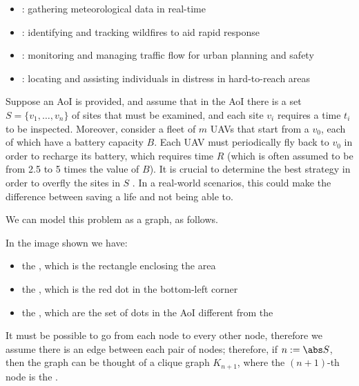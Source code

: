 \documentclass[a4paper, 12pt]{report}
\begin{document}
    \begin{itemize}
        \item {}: gathering meteorological data in real-time
        \item {}: identifying and tracking wildfires to aid rapid response
        \item {}: monitoring and managing traffic flow for urban planning and safety
        \item {}: locating and assisting individuals in distress in hard-to-reach areas
    \end{itemize}

    Suppose an AoI is provided, and assume that in the AoI there is a set $S = \{v_1, \ldots, v_n\}$ of sites that must be examined, and each site $v_i$ requires a time $t_i$ to be inspected. Moreover, consider a fleet of $m$ UAVs that start from a  $v_0$, each of which have a battery capacity $B$. Each UAV must periodically fly back to $v_0$ in order to recharge its battery, which requires time $R$ (which is often assumed to be from 2.5 to 5 times the value of $B$). It is crucial to determine the best strategy in order to overfly the sites in $S$ . In a real-world scenarios, this could make the difference between saving a life and not being able to.

    We can model this problem as a graph, as follows.


    In the image shown we have:

    \begin{itemize}
        \item the , which is the rectangle enclosing the area
        \item the , which is the red dot in the bottom-left corner
        \item the , which are the set of dots in the AoI different from the 
    \end{itemize}

    It must be possible to go from each node to every other node, therefore we assume there is an edge between each pair of nodes; therefore, if $n := \abs S$, then the graph can be thought of a clique graph $K_{n + 1}$, where the $(n + 1)$-th node is the .
\end{document}
